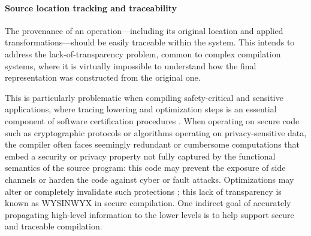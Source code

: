 \paragraph{Source location tracking and traceability}

The provenance of an operation---including its original location and applied
transformations---should be easily traceable within the system. This intends to
address the lack-of-transparency problem, common to complex compilation
systems, where it is virtually impossible to understand how the final
representation was constructed from the original one.

This is particularly problematic when compiling safety-critical and sensitive applications, where tracing lowering and optimization steps is an essential component of software certification procedures \cite{compcert}. When operating on secure code such as cryptographic protocols or algorithms operating on privacy-sensitive data, the compiler often faces seemingly redundant or cumbersome computations that embed a security or privacy property not fully captured by the functional semantics of the source program: this code may prevent the exposure of side channels or harden the code against cyber or fault attacks. Optimizations may alter or completely invalidate such protections \cite{Vu20}; this lack of transparency is known as WYSINWYX \cite{balakrishnan} in secure compilation. One indirect goal of accurately propagating high-level information to the lower levels is to help support secure and traceable compilation.
